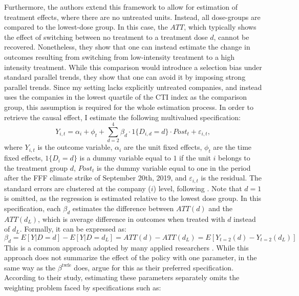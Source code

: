 \documentclass[12pt]{article}
\begin{document}
Furthermore, the authors extend this framework to allow for estimation of treatment effects, where there are no untreated units. Instead, all dose-groups are compared to the lowest-dose group. In this case, the $ATT$, which typically shows the effect of switching between no treatment to a treatment dose $d$, cannot be recovered. Nonetheless, they show that one can instead estimate the change in outcomes resulting from switching from low-intensity treatment to a high intensity treatment. While this comparison would introduce a selection bias under standard parallel trends, they show that one can avoid it by imposing strong parallel trends. Since my setting lacks explicitly untreated companies, and instead uses the companies in the lowest quartile of the CTI index as the comparison group, this assumption is required for the whole estimation process. In order to retrieve the causal effect, I estimate the following multivalued specification:
\begin{equation}
    Y_{i,t} = \alpha_i + \phi_t + \sum_{d=2}^{4} \beta_d \cdot 1\{D_{i,d}=d\}\cdot Post_t + \varepsilon_{i,t},
\end{equation}
where $Y_{i,t}$ is the outcome variable, $\alpha_i$ are the unit fixed effects, $\phi_t$ are the time fixed effects, $1\{D_{i}=d\}$ is a dummy variable equal to $1$ if the unit $i$ belongs to the treatment group $d$, $Post_t$ is the dummy variable equal to one in the period after the FFF climate strike of September 20th, 2019, and $\varepsilon_{i,t}$ is the residual. The standard errors are clustered at the company ($i$) level, following \textcite{abadieWhenShouldYou2022}. Note that $d=1$ is omitted, as the regression is estimated relative to the lowest dose group. In this specification, each $\beta_d$ estimates the difference between $ATT(d)$ and the $ATT(d_L)$, which is average difference in outcomes when treated with $d$ instead of $d_L$. Formally, it can be expressed as: 
\begin{equation}
    \beta_d = E[Y|D = d] - E[Y |D = d_L] = ATT(d) - ATT(d_L) = E[Y_{t=2}(d) - Y_{t=2}(d_L)]
\end{equation}
This is a common approach adopted by many applied researchers \parencite{acemoglu_finkelstein_medicare,deschenes_greenstone_clim_change}. While this approach does not summarize the effect of the policy with one parameter, in the same way as the $\beta^{\text{twfe}}$ does, \citeauthor{callawayDifferenceinDifferencesContinuousTreatment2025} argue for this as their preferred specification. According to their study, estimating these parameters separately omits the weighting problem faced by specifications such as:
\end{document}
